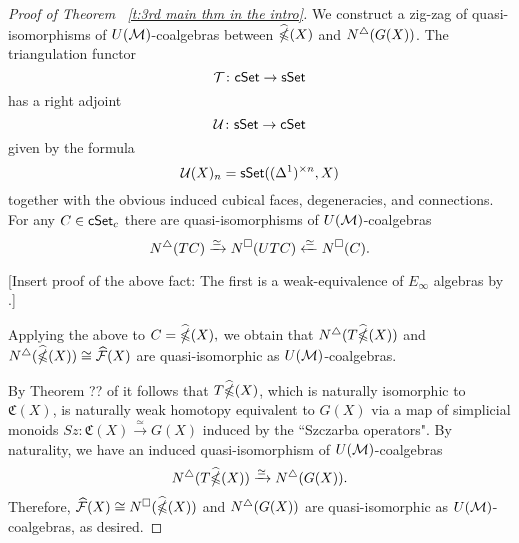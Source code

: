 \begin{proof}[Proof of Theorem ~\ref{t:3rd main thm in the intro}]

We construct a zig-zag of quasi-isomorphisms of $U(\mathcal{M})$-coalgebras between $\widehat{\mathbb{\Omega}}(X)$ and $N^{\triangle} (G(X))$.
The triangulation functor $$\mathcal{T}\colon \mathsf{cSet} \to \mathsf{sSet}$$
has a right adjoint $$\mathcal{U}\colon \mathsf{sSet} \to \mathsf{cSet}$$
given by the formula
$$\mathcal{U}(X)_n= \mathsf{sSet}((\Delta^1)^{\times n}, X)$$
together with the obvious induced cubical faces, degeneracies, and connections. For any $C \in \mathsf{cSet}_c$ there are quasi-isomorphisms of $U(\mathcal{M})$-coalgebras
$$N^{\triangle}(TC) \xrightarrow{\simeq} N^{\square}(UTC) \xleftarrow{\simeq} N^{\square}(C).$$

[Insert proof of the above fact: The first is a weak-equivalence of $E_\infty$ algebras by \cite{medina2021cubical}.]

Applying the above to $C= \widehat{\mathbb{\Omega}}(X),$ we obtain that $N^{\triangle}(T\widehat{\mathbb{\Omega}}(X))$ and $N^{\triangle}(\widehat{\mathbb{\Omega}}(X)) \cong \widehat{\mathcal{F}}(X)$ are quasi-isomorphic as $U(\mathcal{M})$-coalgebras. 

By Theorem ?? of \cite{minichello-rivera-zeinalian} it follows that $T\widehat{\mathbb{\Omega}}(X)$, which is naturally isomorphic to $\mathfrak{C}(X)$, is naturally weak homotopy equivalent to $G(X)$ via a map of simplicial monoids $Sz \colon \mathfrak{C}(X) \xrightarrow{\simeq} G(X)$ induced by the ``Szczarba operators". By naturality, we have an induced quasi-isomorphism of $U(\mathcal{M})$-coalgebras
$$N^{\triangle}(T\widehat{\mathbb{\Omega}}(X)) \xrightarrow{\simeq} N^{\triangle}(G(X)).$$
Therefore, $\widehat{\mathcal{F}}(X) \cong N^{\square}(\widehat{\mathbb{\Omega}}(X))$ and $N^{\triangle}(G(X))$ are quasi-isomorphic as $U(\mathcal{M})$-coalgebras, as desired. 




\end{proof}
